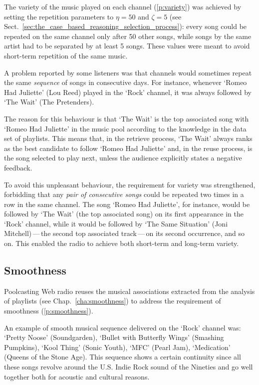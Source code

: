 The variety of the music played on each channel (\ref{p:variety}) was achieved by setting the repetition parameters to $\eta = 50$ and $\zeta = 5$ (see Sect.~\ref{sec:the_case_based_reasoning_selection_process}): every song could be repeated on the same channel only after 50 other songs, while songs by the same artist had to be separated by at least 5 songs.
These values were meant to avoid short-term repetition of the same music.

A problem reported by some listeners was that channels would sometimes repeat the same \emph{sequence} of songs in consecutive days.
For instance, whenever `Romeo Had Juliette' (Lou Reed) played in the `Rock' channel, it was always followed by `The Wait' (The Pretenders).

The reason for this behaviour is that `The Wait' is the top associated song with `Romeo Had Juliette' in the music pool according to the knowledge in the data set of playlists.
This means that, in the retrieve process, `The Wait' always ranks as the best candidate to follow `Romeo Had Juliette' and, in the reuse process, is the song selected to play next, unless the audience explicitly states a negative feedback.

To avoid this unpleasant behaviour, the requirement for variety was strengthened, forbidding that any \emph{pair of consecutive songs} could be repeated two times in a row in the same channel.
The song `Romeo Had Juliette', for instance, would be followed by `The Wait' (the top associated song) on its first appearance in the `Rock' channel, 
while it would be followed by `The Same Situation' (Joni Mitchell)\,---\,the second top associated track\,---\,on its second occurrence, and so on.
This enabled the radio to achieve both short-term and long-term variety.

\subsection{Smoothness} %
\label{sub:smoothness2}

Poolcasting Web radio reuses the musical associations extracted from the analysis of playlists (see Chap.~\ref{cha:smoothness}) to address the requirement of smoothness (\ref{p:smoothness}). 

An example of smooth musical sequence delivered on the `Rock' channel was: `Pretty Noose' (Soundgarden), `Bullet with Butterfly Wings' (Smashing Pumpkins), `Kool Thing' (Sonic Youth), `MFC' (Pearl Jam), `Medication' (Queens of the Stone Age).
This sequence shows a certain continuity since all these songs revolve around the U.S. Indie Rock sound of the Nineties and go well together both for acoustic and cultural reasons.

